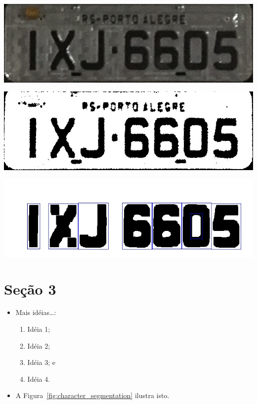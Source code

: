 \documentclass[a0,portrait]{a0poster}
\newcommand\itemadjust{\itemsep.5em \parskip0pt \parsep0pt}
\begin{document}
\begin{multicols}{2}
\begin{center}
	\includegraphics[width=0.99\linewidth]{10roi.jpg}
	\label{fig:license_plate}
\end{center}

\begin{center}
	\includegraphics[width=0.99\linewidth]{a02fill_binary.jpg}
	\label{fig:license_plate}
\end{center}

\begin{center}
	\includegraphics[width=0.99\linewidth]{character_segmentation.jpeg}
	\label{fig:character_segmentation}
\end{center}


\color{NavyBlue}
\section*{\huge Seção 3}
\color{Black}

\begin{itemize}
	\item Mais idéias\dots:
	\begin{enumerate}
		[leftmargin=2em]\itemadjust
		\item Idéia 1;
		\item Idéia 2;
		\item Idéia 3; e
		\item Idéia 4.
	\end{enumerate}
	\item A Figura~\ref{fig:character_segmentation} ilustra isto.
\end{itemize}



\end{multicols}
\end{document}
